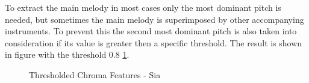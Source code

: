 To extract the main melody in most cases only the most dominant pitch is needed, but sometimes the main melody is superimposed by other accompanying instruments. To prevent this the second most dominant pitch is also taken into consideration if its value is greater then a specific threshold. 
The result is shown in figure with the threshold 0.8 \ref{fig:chromavg}. 
\begin{figure}[htbp]
	\centering
	\caption{Thresholded Chroma Features - Sia}
	\label{fig:chromavg}
\end{figure}

